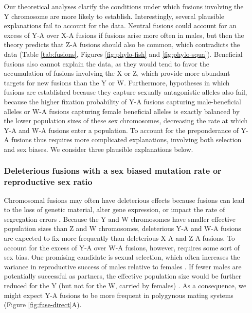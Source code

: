 Our theoretical analyses clarify the conditions under which fusions involving the Y chromosome are more likely to establish. Interestingly, several plausible explanations fail to account for the data. Neutral fusions could account for an excess of Y-A over X-A fusions if fusions arise more often in males, but then the theory predicts that Z-A fusions should also be common, which contradicts the data (Table \ref{tab:fusions}, Figures \ref{fig:phylo-fish} and \ref{fig:phylo-squa}). Beneficial fusions also cannot explain the data, as they would tend to favor the accumulation of fusions involving the X or Z, which provide more abundant targets for new fusions than the Y or W. Furthermore, hypotheses in which fusions are established because they capture sexually antagonistic alleles also fail, because the higher fixation probability of Y-A fusions capturing male-beneficial alleles or W-A fusions capturing female beneficial alleles is exactly balanced by the lower population sizes of these sex chromosomes, decreasing the rate at which Y-A and W-A fusions enter a population. To account for the preponderance of Y-A fusions thus requires more complicated explanations, involving both selection and sex biases. We consider three plausible explanations below.

\subsubsection{Deleterious fusions with a sex biased mutation rate or reproductive sex ratio}

Chromosomal fusions may often have deleterious effects because fusions can lead to the loss of genetic material, alter gene expression, or impact the rate of segregation errors \citep{Ohno1967, Gardner2012}. Because the Y and W chromosomes have smaller effective population sizes than Z and W chromosomes, deleterious Y-A and W-A fusions are expected to fix more frequently than deleterious X-A and Z-A fusions.
To account for the excess of Y-A over W-A fusions, however, requires some sort of sex bias. One promising candidate is sexual selection, which often increases the variance in reproductive success of males relative to females \citep[Bateman's principle;][]{Bateman1948}. If fewer males are potentially successful as partners, the effective population size would be further reduced for the Y (but not for the W, carried by females) \citep{Bachtrog2011, Bandy2002}. As a consequence, we might expect Y-A fusions to be more frequent in polygynous mating systems (Figure \ref{fig:fuse-direct}A).

